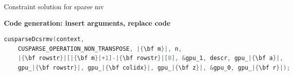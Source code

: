 \caption{Constraint solution for sparse mv}
\label{fig:spmvexample2}

\centering
\vspace{0.0em}
{\centering
\begin{minipage}{0.05\linewidth}
\vspace{0pt}
\centering
{}
\end{minipage}
\begin{minipage}{\linewidth}
\centering
\textbf{Code generation: insert arguments, replace code}
\end{minipage}
\begin{minipage}{0.05\linewidth}
\vspace{0pt}
\centering
{}
\end{minipage}
}


\begin{lstlisting}[escapechar=|,mathescape,commentstyle=\color{gray}\itshape,language=C,basicstyle=\linespread{0.75}\small\ttfamily,
                   label={fig:spmvexample3},caption={Generated function call to cuSPARSE}]
cusparseDcsrmv(context,
    CUSPARSE_OPERATION_NON_TRANSPOSE, |{\bf m}|, n,
    |{\bf rowstr}|[|{\bf m}|+1]-|{\bf rowstr}|[0], &gpu_1, descr, gpu_|{\bf a}|,
    gpu_|{\bf rowstr}|, gpu_|{\bf colidx}|, gpu_|{\bf z}|, &gpu_0, gpu_|{\bf r}|);
\end{lstlisting}
\vspace{-0.287cm}
